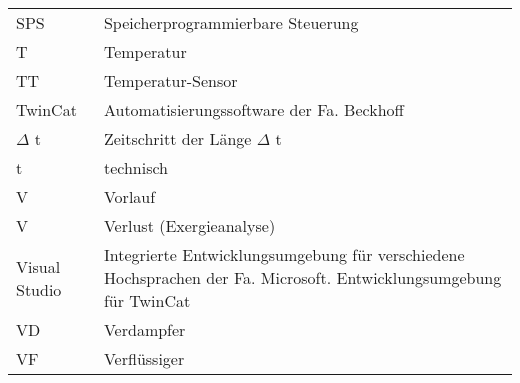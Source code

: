 \begin{onehalfspacing}
\begin{longtable}[h]{p{} p{}}
		SPS & Speicherprogrammierbare Steuerung \\
		T & Temperatur\\
		TT & Temperatur-Sensor\\
		TwinCat & Automatisierungssoftware der Fa. Beckhoff\\
		$\Delta$ t & Zeitschritt der Länge $\Delta$ t\\
		t & technisch\\
		V & Vorlauf\\
		V & Verlust (Exergieanalyse)\\
		Visual Studio & Integrierte Entwicklungsumgebung für verschiedene Hochsprachen der Fa. Microsoft. Entwicklungsumgebung für TwinCat\\
		VD & Verdampfer \\
		VF & Verflüssiger \\

		
\end{longtable}
\end{onehalfspacing}
